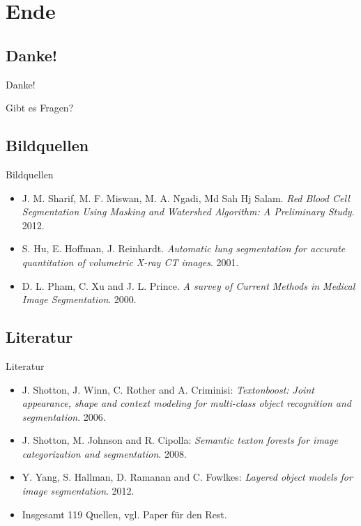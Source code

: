 \section{Ende}
\subsection{Danke!}
\begin{frame}{Danke!}
    \begin{center}
        \Huge
	    Gibt es Fragen?
    \end{center}
\end{frame}

\subsection{Bildquellen}
\begin{frame}{Bildquellen}
\begin{itemize}
	\item J. M. Sharif, M. F. Miswan, M. A. Ngadi, Md Sah Hj Salam.
          \textit{Red Blood Cell Segmentation Using Masking and Watershed Algorithm: A Preliminary Study}. 2012.
    \item S. Hu, E. Hoffman, J. Reinhardt. \textit{Automatic lung segmentation for accurate quantitation of volumetric X-ray CT images}. 2001.
    \item D. L. Pham, C. Xu and J. L. Prince. \textit{A survey of Current Methods in Medical Image Segmentation}. 2000.
\end{itemize}
\end{frame}

\subsection{Literatur}
\begin{frame}{Literatur}
\begin{itemize}
    \item J. Shotton, J. Winn, C. Rother and  A. Criminisi: \textit{Textonboost: Joint appearance, shape and context modeling for multi-class object recognition and segmentation}. 2006.
    \item J. Shotton, M. Johnson and R. Cipolla: \textit{Semantic texton forests for image categorization and segmentation}. 2008.
    \item Y. Yang, S. Hallman, D. Ramanan and C. Fowlkes: \textit{Layered object models for image segmentation}. 2012.
    \item Insgesamt 119 Quellen, vgl. Paper für den Rest.
\end{itemize}
\end{frame}

